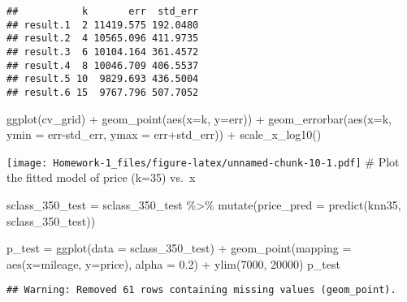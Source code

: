 \documentclass[
]{article}
\newenvironment{Shaded}{\begin{snugshade}}{\end{snugshade}}
\newcommand{\AttributeTok}[1]{\textcolor[rgb]{0.77,0.63,0.00}{#1}}
\newcommand{\DecValTok}[1]{\textcolor[rgb]{0.00,0.00,0.81}{#1}}
\newcommand{\FloatTok}[1]{\textcolor[rgb]{0.00,0.00,0.81}{#1}}
\newcommand{\FunctionTok}[1]{\textcolor[rgb]{0.00,0.00,0.00}{#1}}
\newcommand{\NormalTok}[1]{#1}
\newcommand{\OtherTok}[1]{\textcolor[rgb]{0.56,0.35,0.01}{#1}}
\newcommand{\SpecialCharTok}[1]{\textcolor[rgb]{0.00,0.00,0.00}{#1}}
\begin{document}
\begin{verbatim}
##           k       err  std_err
## result.1  2 11419.575 192.0480
## result.2  4 10565.096 411.9735
## result.3  6 10104.164 361.4572
## result.4  8 10046.709 406.5537
## result.5 10  9829.693 436.5004
## result.6 15  9767.796 507.7052
\end{verbatim}

\begin{Shaded}
\begin{Highlighting}[]
\FunctionTok{ggplot}\NormalTok{(cv\_grid) }\SpecialCharTok{+} \FunctionTok{geom\_point}\NormalTok{(}\FunctionTok{aes}\NormalTok{(}\AttributeTok{x=}\NormalTok{k, }\AttributeTok{y=}\NormalTok{err)) }\SpecialCharTok{+} \FunctionTok{geom\_errorbar}\NormalTok{(}\FunctionTok{aes}\NormalTok{(}\AttributeTok{x=}\NormalTok{k, }\AttributeTok{ymin =}\NormalTok{ err}\SpecialCharTok{{-}}\NormalTok{std\_err, }\AttributeTok{ymax =}\NormalTok{ err}\SpecialCharTok{+}\NormalTok{std\_err)) }\SpecialCharTok{+} \FunctionTok{scale\_x\_log10}\NormalTok{()}
\end{Highlighting}
\end{Shaded}

\texttt{[image: Homework-1\_files/figure-latex/unnamed-chunk-10-1.pdf]}
\# Plot the fitted model of price (k=35) vs.~x

\begin{Shaded}
\begin{Highlighting}[]
\NormalTok{sclass\_350\_test }\OtherTok{=}\NormalTok{ sclass\_350\_test }\SpecialCharTok{\%\textgreater{}\%}
  \FunctionTok{mutate}\NormalTok{(}\AttributeTok{price\_pred =} \FunctionTok{predict}\NormalTok{(knn35, sclass\_350\_test))}

\NormalTok{p\_test }\OtherTok{=} \FunctionTok{ggplot}\NormalTok{(}\AttributeTok{data =}\NormalTok{ sclass\_350\_test) }\SpecialCharTok{+} \FunctionTok{geom\_point}\NormalTok{(}\AttributeTok{mapping =} \FunctionTok{aes}\NormalTok{(}\AttributeTok{x=}\NormalTok{mileage, }\AttributeTok{y=}\NormalTok{price), }\AttributeTok{alpha =} \FloatTok{0.2}\NormalTok{) }\SpecialCharTok{+} \FunctionTok{ylim}\NormalTok{(}\DecValTok{7000}\NormalTok{, }\DecValTok{20000}\NormalTok{)}
\NormalTok{p\_test}
\end{Highlighting}
\end{Shaded}

\begin{verbatim}
## Warning: Removed 61 rows containing missing values (geom_point).
\end{verbatim}
\end{document}
